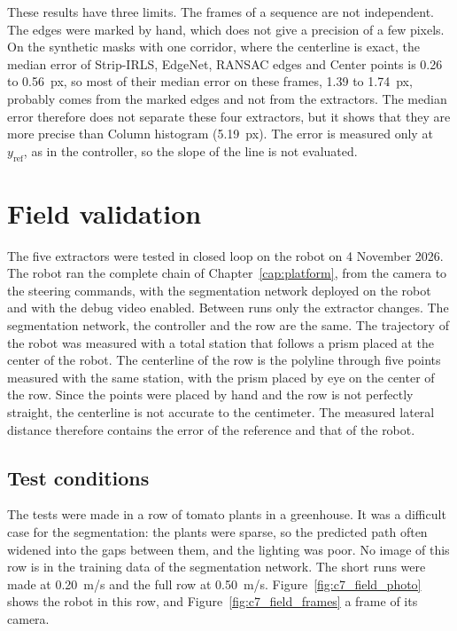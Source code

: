 These results have three limits. The frames of a sequence are not independent. The edges were marked by hand, which does not give a precision of a few pixels. On the synthetic masks with one corridor, where the centerline is exact, the median error of Strip-IRLS, EdgeNet, RANSAC edges and Center points is 0.26 to 0.56~px, so most of their median error on these frames, 1.39 to 1.74~px, probably comes from the marked edges and not from the extractors. The median error therefore does not separate these four extractors, but it shows that they are more precise than Column histogram (5.19~px). The error is measured only at $y_{\mathrm{ref}}$, as in the controller, so the slope of the line is not evaluated.

\section{Field validation}
\label{sec:field_validation}

The five extractors were tested in closed loop on the robot on 4 November 2026. The robot ran the complete chain of Chapter~\ref{cap:platform}, from the camera to the steering commands, with the segmentation network deployed on the robot and with the debug video enabled. Between runs only the extractor changes. The segmentation network, the controller and the row are the same. The trajectory of the robot was measured with a total station that follows a prism placed at the center of the robot. The centerline of the row is the polyline through five points measured with the same station, with the prism placed by eye on the center of the row. Since the points were placed by hand and the row is not perfectly straight, the centerline is not accurate to the centimeter. The measured lateral distance therefore contains the error of the reference and that of the robot.

\subsection{Test conditions}
\label{subsec:test_conditions}

The tests were made in a row of tomato plants in a greenhouse. It was a difficult case for the segmentation: the plants were sparse, so the predicted path often widened into the gaps between them, and the lighting was poor. No image of this row is in the training data of the segmentation network. The short runs were made at 0.20~m/s and the full row at 0.50~m/s. Figure~\ref{fig:c7_field_photo} shows the robot in this row, and Figure~\ref{fig:c7_field_frames} a frame of its camera.

